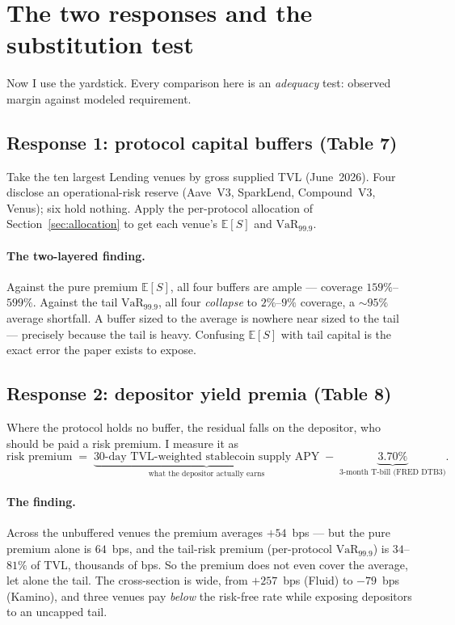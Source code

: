 \documentclass[11pt]{article}
\theoremstyle{definition}
\theoremstyle{remark}
\theoremstyle{definition}
\newcommand{\E}{\mathbb{E}}
\newcommand{\VaR}{\mathrm{VaR}}
\newcommand{\1}{\mathbf{1}}
\begin{document}
\section{The two responses and the substitution test}\label{sec:responses}

Now I use the yardstick. Every comparison here is an \emph{adequacy} test:
observed margin against modeled requirement.

\subsection{Response 1: protocol capital buffers (Table 7)}

Take the ten largest Lending venues by gross supplied TVL (June~2026). Four
disclose an operational-risk reserve (Aave~V3, SparkLend, Compound~V3, Venus);
six hold nothing. Apply the per-protocol allocation of Section~\ref{sec:allocation}
to get each venue's $\E[S]$ and $\VaR_{99.9}$.

\paragraph{The two-layered finding.}
Against the pure premium $\E[S]$, all four buffers are ample ---
coverage $159\%$--$599\%$. Against the tail $\VaR_{99.9}$, all four
\emph{collapse} to $2\%$--$9\%$ coverage, a $\sim 95\%$ average shortfall. A
buffer sized to the average is nowhere near sized to the tail --- precisely
because the tail is heavy. Confusing $\E[S]$ with tail capital is the exact
error the paper exists to expose.

\subsection{Response 2: depositor yield premia (Table 8)}

Where the protocol holds no buffer, the residual falls on the depositor, who
should be paid a risk premium. I measure it as
\[
\text{risk premium}
\;=\; \underbrace{\text{30-day TVL-weighted stablecoin supply APY}}_{\text{what the depositor actually earns}}
\;-\; \underbrace{3.70\%}_{\text{3-month T-bill (FRED DTB3)}}.
\]

\paragraph{The finding.}
Across the unbuffered venues the premium averages $+54$~bps --- but the pure
premium alone is $64$~bps, and the tail-risk premium (per-protocol
$\VaR_{99.9}$) is $34$--$81\%$ of TVL, thousands of bps. So the premium does
not even cover the average, let alone the tail. The cross-section is wide,
from $+257$~bps (Fluid) to $-79$~bps (Kamino), and three venues pay
\emph{below} the risk-free rate while exposing depositors to an uncapped tail.
\end{document}
